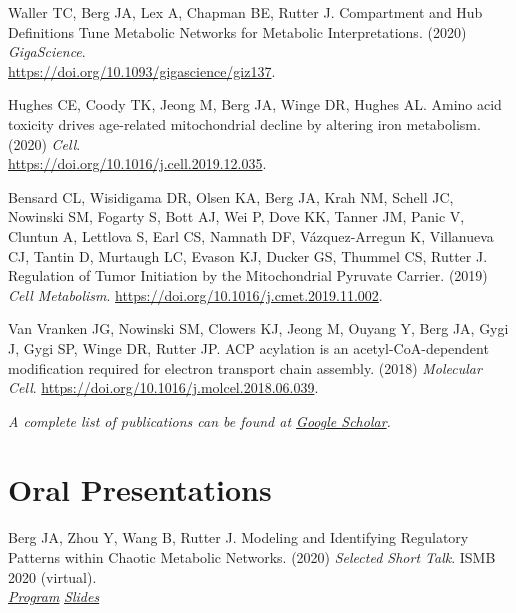 \documentclass[margin,line]{res}
\begin{document}
\begin{resume}
Waller TC, Berg JA, Lex A, Chapman BE, Rutter J. Compartment and Hub Definitions Tune Metabolic Networks for Metabolic Interpretations. (2020) \textit{GigaScience}. \\ \href{https://academic.oup.com/gigascience/article/9/1/giz137/5714891}{https://doi.org/10.1093/gigascience/giz137}.

Hughes CE, Coody TK, Jeong M, Berg JA, Winge DR, Hughes AL. Amino acid toxicity drives age-related mitochondrial decline by altering iron metabolism. (2020) \textit{Cell}. \\
\href{https://www.sciencedirect.com/science/article/pii/S0092867419313972?via\%3Dihub}{https://doi.org/10.1016/j.cell.2019.12.035}.

Bensard CL, Wisidigama DR, Olsen KA, Berg JA, Krah NM, Schell JC, Nowinski SM, Fogarty S, Bott AJ, Wei P, Dove KK, Tanner JM, Panic V, Cluntun A, Lettlova S, Earl CS, Namnath DF, Vázquez-Arregun K, Villanueva CJ, Tantin D, Murtaugh LC, Evason KJ, Ducker GS, Thummel CS, Rutter J. Regulation of Tumor Initiation by the Mitochondrial Pyruvate Carrier. (2019) \textit{Cell Metabolism}. \href{https://www.sciencedirect.com/science/article/pii/S1550413119306096}{https://doi.org/10.1016/j.cmet.2019.11.002}.

Van Vranken JG, Nowinski SM, Clowers KJ, Jeong M, Ouyang Y, Berg JA, Gygi J, Gygi SP, Winge DR, Rutter JP. ACP acylation is an acetyl-CoA-dependent modification required for electron transport chain assembly. (2018) \textit{Molecular Cell}. \href{https://www.sciencedirect.com/science/article/pii/S1097276518305148}{https://doi.org/10.1016/j.molcel.2018.06.039}.

\textit{\small{A complete list of publications can be found at \href{https://scholar.google.com/citations?user=0XsLZ3sAAAAJ&hl=en}{Google Scholar}.}}


\section{\sc Oral Presentations}
%
%

Berg JA, Zhou Y, Wang B, Rutter J. Modeling and Identifying Regulatory Patterns within Chaotic Metabolic Networks. (2020) \textit{Selected Short Talk}. ISMB 2020 (virtual). \\
\hspace*{12pt} \textit{\href{https://www.iscb.org/cms_addon/conferences/ismb2020/tracks/netbiocosi}{Program}}
\hspace*{12pt} \textit{\href{https://github.com/j-berg/presentations/blob/master/ISMB-2020/2020-07-16_ISMB-2020_Metaboverse.pdf}{Slides}}


\end{resume}
\end{document}
